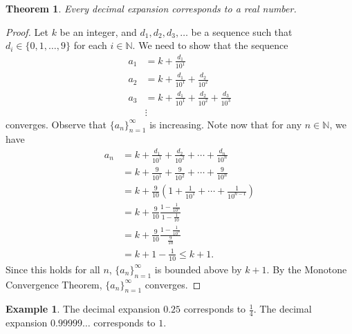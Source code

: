 \documentclass[12pt]{amsart}
\newcommand{\N}{\mathbb{N}}
\numberwithin{equation}{section}
\theoremstyle{plain} %
\newtheorem{thm}[equation]{Theorem}
\theoremstyle{definition}
\newtheorem{ex}[equation]{Example}
\theoremstyle{remark}
\begin{document}
\begin{thm}
Every decimal expansion corresponds to a real number.
\end{thm}
\begin{proof}
Let $k$ be an integer, and $d_1,d_2,d_3,\dots$ be a sequence such that $d_i\in \{0,1,\dots,9\}$ for each $i\in \N$. We need to show that the sequence 
\begin{align*}
a_1 &= k + \frac{d_1}{10^1} \\
a_2 &= k + \frac{d_1}{10^1} + \frac{d_2}{10^2} \\
a_3 &= k + \frac{d_1}{10^1} + \frac{d_2}{10^2} + \frac{d_3}{10^3}\\
&\vdots
\end{align*}
converges. Observe that $\{a_n\}_{n=1}^\infty$ is increasing. Note now that for any $n\in \N$, we have
\begin{align*}
a_n &=k + \frac{d_1}{10^1} + \frac{d_2}{10^2} + \cdots + \frac{d_n}{10^n}\\
&=k + \frac{9}{10^1} + \frac{9}{10^2} + \cdots + \frac{9}{10^n}\\
&=k + \frac{9}{10} \left( 1 + \frac{1}{10^1} + \cdots + \frac{1}{10^{n-1}} \right) \\
&= k+ \frac{9}{10} \frac{ 1 - \frac{1}{10^n} }{1- \frac{1}{10}}\\
&= k+ \frac{9}{10} \frac{ 1 - \frac{1}{10^n} }{\frac{9}{10}}\\
&= k+ 1-\frac{1}{10} \leq k+1.\end{align*}
Since this holds for all $n$, $\{a_n\}_{n=1}^\infty$ is bounded above by $k+1$. By the Monotone Convergence Theorem, $\{a_n\}_{n=1}^\infty$ converges.
\end{proof}

\begin{ex} The decimal expansion $0.25$ corresponds to $\frac{1}{4}$. The decimal expansion $0.99999\dots$ corresponds to $1$.\end{ex}
\end{document}
